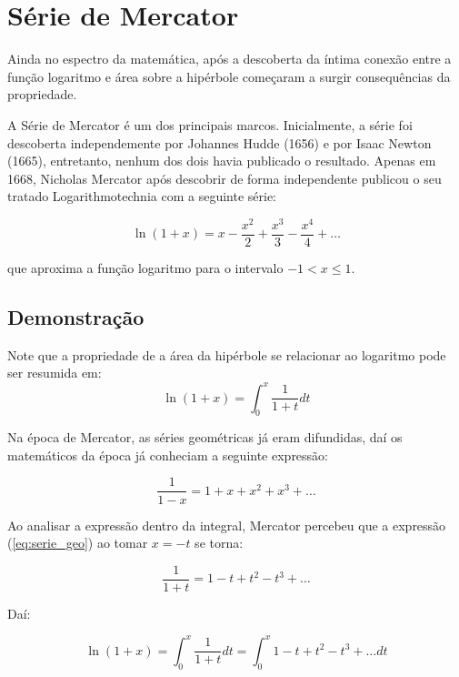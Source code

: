 \section{Série de Mercator}

Ainda no espectro da matemática, após a descoberta da íntima conexão entre a função logaritmo e área sobre a hipérbole começaram a surgir consequências da propriedade. 

A Série de Mercator é um dos principais marcos. Inicialmente, a série foi descoberta independemente por Johannes Hudde (1656) e por Isaac Newton (1665), entretanto, nenhum dos dois havia publicado o resultado. Apenas em 1668, Nicholas Mercator após descobrir de forma independente publicou o seu tratado Logarithmotechnia com a seguinte série:

\begin{equation*}
    \ln(1+x) = x - \dfrac{x^2}{2} + \dfrac{x^3}{3} - \dfrac{x^4}{4} + \ldots
\end{equation*}

que aproxima a função logaritmo para o intervalo $-1<x \le 1$.

\subsection{Demonstração}

Note que a propriedade de a área da hipérbole se relacionar ao logaritmo pode ser resumida em: 
\begin{equation}
    \ln(1+x) = \int_{0}^{x}\dfrac{1}{1+t}dt
\end{equation}


Na época de Mercator, as séries geométricas já eram difundidas, daí os matemáticos da época já conheciam a seguinte expressão:

\begin{equation} \label{eq:serie_geo}
    \frac{1}{1-x} = 1 + x+x^2+x^3 + \ldots
\end{equation}

Ao analisar a expressão dentro da integral, Mercator percebeu que a expressão (\ref{eq:serie_geo}) ao tomar $x = -t$ se torna:

\begin{equation}
    \dfrac{1}{1+t} = 1 -t+t^2-t^3 + \ldots
\end{equation}

Daí:

\begin{equation}
    \ln(1+x) = \int_{0}^{x}\dfrac{1}{1+t}dt = \int_{0}^{x} 1 -t+t^2-t^3 + \ldots dt
\end{equation}


